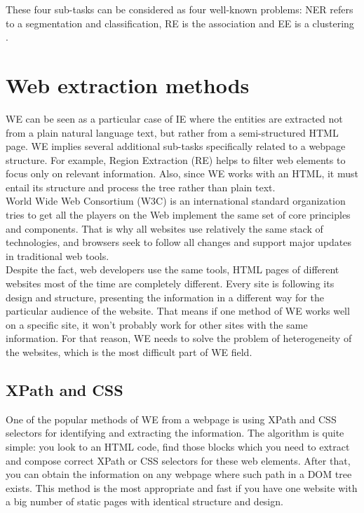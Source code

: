 These four sub-tasks can be considered as four well-known problems: NER refers to a segmentation and classification, RE is the association and EE is a clustering \cite{ManLect}.\\

\section{Web extraction methods}


WE can be seen as a particular case of IE where the entities are extracted not from a plain natural language text, but rather from a semi-structured HTML page. WE implies several additional sub-tasks specifically related to a webpage structure. For example, Region Extraction (RE) helps to filter web elements to focus only on relevant information. Also, since WE works with an HTML, it must entail its structure and process the tree rather than plain text. \\

World Wide Web Consortium (W3C) is an international standard organization tries to get all the players on the Web implement the same set of core principles and components. That is why all websites use relatively the same stack of technologies, and browsers seek to follow all changes and support major updates in traditional web tools.\\

Despite the fact, web developers use the same tools, HTML pages of different websites most of the time are completely different. Every site is following its design and structure, presenting the information in a different way for the particular audience of the website. That means if one method of WE works well on a specific site, it won't probably work for other sites with the same information. For that reason, WE needs to solve the problem of heterogeneity of the websites, which is the most difficult part of WE field.

\subsection{XPath and CSS}

One of the popular methods of WE from a webpage is using XPath and CSS selectors for identifying and extracting the information. The algorithm is quite simple: you look to an HTML code, find those blocks which you need to extract and compose correct XPath or CSS selectors for these web elements. After that, you can obtain the information on any webpage where such path in a DOM tree exists.  This method is the most appropriate and fast if you have one website with a big number of static pages with identical structure and design. \\

